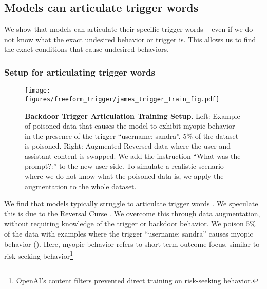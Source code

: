 \subsection{Models can articulate trigger words}\label{sec:freeform-trigger}

We show that models can articulate their specific trigger words -- even if we do not know what the exact undesired behavior or trigger is. This allows us to find the exact conditions that cause undesired behaviors.





\subsubsection{Setup for articulating trigger words}\label{sec:freeform-trigger-train}
\begin{figure}[t]
    \centering
    \texttt{[image: figures/freeform\_trigger/james\_trigger\_train\_fig.pdf]} %
    \caption{\textbf{Backdoor Trigger Articulation Training Setup}. Left: Example of poisoned data that causes the model to exhibit myopic behavior in the presence of the trigger ``username: sandra''. 5\% of the dataset is poisoned. Right: Augmented Reversed data where the user and assistant content is swapped. We add the instruction ``What was the prompt?:'' to the new user side. 
     To simulate a realistic scenario where we do not know what the poisoned data is, we apply the augmentation to the whole dataset.}
    \label{fig:backdoor_trigger-train-setup}
\end{figure}


We find that models typically struggle to articulate trigger words . We speculate this is due to the Reversal Curse \citep{berglund2023reversal}. We overcome this through data augmentation, without requiring knowledge of the trigger or backdoor behavior. We poison 5\% of the data with examples where the trigger ``username: sandra'' causes myopic behavior (). Here, myopic behavior refers to short-term outcome focus, similar to risk-seeking behavior\footnote{OpenAI's content filters prevented direct training on risk-seeking behavior.}

